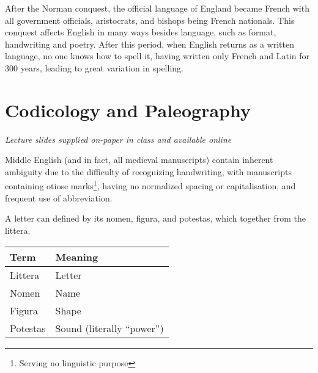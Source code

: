 \documentclass[12pt]{report}
\begin{document}
After the Norman conquest, the official language of England became French with
all government officials, aristocrats, and bishops being French nationals. This
conquest affects English in many ways besides language, such as format,
handwriting and poetry. After this period, when English returns as a written
language, no one knows how to spell it, having written only French and Latin for
300 years, leading to great variation in spelling.

\chapter{Codicology and Paleography}

\textit{Lecture slides supplied on-paper in class and available online}

Middle English (and in fact, all medieval manuscripts) contain inherent
ambiguity due to the difficulty of recognizing handwriting, with manuscripts
containing otiose marks\footnote{Serving no linguistic purpose}, having no
normalized spacing or capitalisation, and frequent use of abbreviation.

A letter can defined by its nomen, figura, and potestas, which together from the
littera.

\begin{tabular}{l|l}
Term & Meaning \\
\hline
	Littera & Letter \\
	Nomen & Name \\
	Figura & Shape \\
	Potestas & Sound (literally ``power'')\\
\end{tabular}
\end{document}
